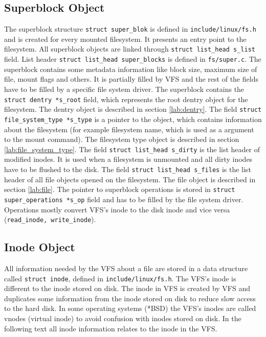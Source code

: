 \subsection{Superblock Object}
The superblock structure \texttt{struct super\_blok} is defined in
\texttt{include/linux/fs.h} and is created for every mounted filesystem. It presents
an entry point to the filesystem. All superblock objects are linked through
\texttt{struct list\_head s\_list} field. List header \texttt{struct list\_head
super\_blocks} is defined in \texttt{fs/super.c}. The superblock contains some metadata
information like block size, maximum size of file, mount flags and others. It is
partially filled by VFS and the rest of the fields have to be filled by a specific file
system driver. The superblock contains the \texttt{struct dentry *s\_root} field, which
represents the root dentry object for the filesystem. The dentry object is described in section
\ref{lab:dentry}. The field \texttt{struct file\_system\_type *s\_type} is a pointer
to the object, which contains information about the filesystem (for example filesystem
name, which is used as a argument to the mount command). The filesystem type object is
described in section \ref{lab:file_system_type}. The field \texttt{struct list\_head
s\_dirty} is the list header of modified inodes. It is used when a filesystem is
unmounted and all dirty inodes have to be flushed to the disk. The field \texttt{struct
list\_head s\_files} is the list header of all file objects opened on the
filesystem. The file
object is described in section \ref{lab:file}. The pointer to superblock operations is
stored in \texttt{struct super\_operations *s\_op} field and has to be filled by the file
system driver. Operations mostly convert VFS's inode to the disk inode and
vice versa (\texttt{read\_inode, write\_inode}).

\subsection{Inode Object}
\label{lab:inode}
All information needed by the VFS about a file are stored in a data structure called
\texttt{struct inode}, defined in \texttt{include/linux/fs.h}. The VFS's inode is
different to the inode stored on disk. The inode in VFS is created by VFS and duplicates
some information from the inode stored on disk to reduce slow access to the hard disk. In
some operating systems (*BSD) the VFS's inodes are called vnodes (virtual inode) to
avoid confusion with inodes stored on disk. In the following text all inode
information relates to the inode in the VFS.

